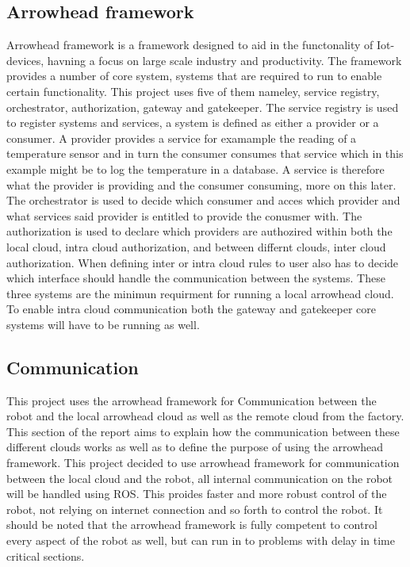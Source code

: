 \subsection{Arrowhead framework}
Arrowhead framework is a framework designed to aid in the functonality of Iot-devices, havning a focus on large scale industry and
productivity. The framework provides a number of core system, systems that are required to run to enable certain functionality. This 
project uses five of them nameley, service registry, orchestrator, authorization, gateway and gatekeeper. The service registry is used 
to register systems and services, a system is defined as either a provider or a consumer. A provider provides a service for examample 
the reading of a temperature sensor and in turn the consumer consumes that service which in this example might be to log the temperature
in a database. A service is therefore what the provider is providing and the consumer consuming, more on this later. The orchestrator is
used to decide which consumer and acces which provider and what services said provider is entitled to provide the conusmer with. The
authorization is used to declare which providers are authozired within both the local cloud, intra cloud authorization, and between
differnt clouds, inter cloud authorization. When defining inter or intra cloud rules to user also has to decide which interface should 
handle the communication between the systems. These three systems are the minimun requirment for running a local arrowhead cloud. 
To enable intra cloud communication both the gateway and gatekeeper core systems will have to be running as well. 

\subsection{Communication}
This project uses the arrowhead framework for Communication between the robot and the local arrowhead cloud as well as the 
remote cloud from the factory. This section of the report aims to explain how the communication between these different clouds works as well
as to define the purpose of using the arrowhead framework. This project decided to use arrowhead framework for communication between 
the local cloud and the robot, all internal communication on the robot will be handled using ROS. This proides faster and more robust 
control of the robot, not relying on internet connection and so forth to control the robot. It should be noted that the arrowhead framework
is fully competent to control every aspect of the robot as well, but can run in to problems with delay in time critical sections.

